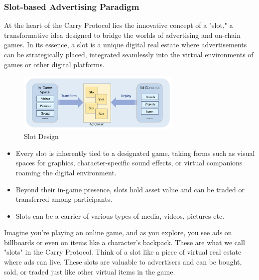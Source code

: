 \subsubsection{Slot-based Advertising Paradigm}
At the heart of the Carry Protocol lies the innovative concept of a "slot," a transformative idea designed to bridge the worlds of advertising and on-chain games. In its essence, a slot is a unique digital real estate where advertisements can be strategically placed, integrated seamlessly into the virtual environments of games or other digital platforms.

\begin{figure}[h]
    \centering
    \includegraphics[width=0.7\textwidth]{Slot Design.png}
    \caption{Slot Design}
    \label{fig:slot_basic}
\end{figure}

\begin{itemize}
    \item Every slot is inherently tied to a designated game, taking forms such as visual spaces for graphics, character-specific sound effects, or virtual companions roaming the digital environment.
    \item Beyond their in-game presence, slots hold asset value and can be traded or transferred among participants.
    \item Slots can be a carrier of various types of media, videos, pictures etc.
\end{itemize}

Imagine you're playing an online game, and as you explore, you see ads on billboards or even on items like a character's backpack. These are what we call "slots" in the Carry Protocol. Think of a slot like a piece of virtual real estate where ads can live. These slots are valuable to advertisers and can be bought, sold, or traded just like other virtual items in the game.




